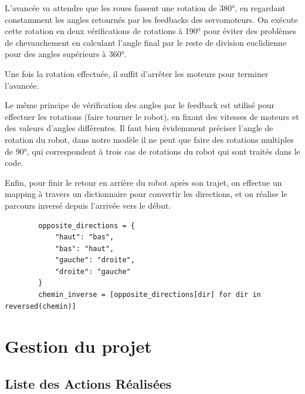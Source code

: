 \documentclass[a4paper,12pt]{report}  %
\begin{document}
L’avancée va attendre que les roues fassent une rotation de 380°, en regardant constamment les angles retournés par les feedbacks des servomoteurs. On exécute cette rotation en deux vérifications de rotations à 190° pour éviter des problèmes de chevauchement en calculant l’angle final par le reste de division euclidienne pour des angles supérieurs à 360°.

Une fois la rotation effectuée, il suffit d’arrêter les moteurs pour terminer l’avancée.

Le même principe de vérification des angles par le feedback est utilisé pour effectuer les rotations (faire tourner le robot), en fixant des vitesses de moteurs et des valeurs d’angles différentes. Il faut bien évidemment préciser l’angle de rotation du robot, dans notre modèle il ne peut que faire des rotations multiples de 90°, qui correspondent à trois cas de rotations du robot qui sont traités dans le code.

Enfin, pour finir le retour en arrière du robot après son trajet, on effectue un mapping à travers un dictionnaire pour convertir les directions, et on réalise le parcours inversé depuis l’arrivée vers le début.

{\scriptsize
	\begin{lstlisting}
		opposite_directions = {
			"haut": "bas",
			"bas": "haut",
			"gauche": "droite",
			"droite": "gauche"
		}
		chemin_inverse = [opposite_directions[dir] for dir in reversed(chemin)]
	\end{lstlisting}
}


\pagebreak
\section{Gestion du projet}



\subsection{Liste des Actions Réalisées}
\end{document}
